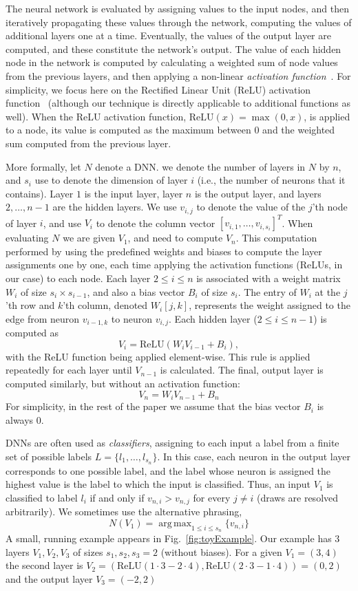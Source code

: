 \documentclass{easychair}
\DeclareMathOperator*{\argmax}{arg\,max}
\newcommand{\relu}{\text{ReLU}\xspace{}}
\begin{document}
The neural network is evaluated by assigning values to the input
nodes, and then iteratively propagating these values through the
network, computing the values of additional layers one at a
time. Eventually, the values of the output layer are computed, and
these constitute the network's output.  The value of each hidden node
in the network is computed by calculating a weighted sum of node
values from the previous layers, and then applying a non-linear
\emph{activation function}~\cite{FoBeCu16}.  For simplicity, we focus
here on the Rectified Linear Unit (ReLU) activation
function~\cite{NaHi10} (although our technique is directly applicable
to additional functions as well).  When the ReLU activation function,
$\relu{}(x) = \max{}(0, x)$, is applied to a node, its value is
computed as the maximum between $0$ and the weighted sum computed from
the previous layer.

More formally, let $N$ denote a DNN. we
denote the number of layers in $N$ by $n$, and $s_i$ use to denote the
dimension of layer $i$ (i.e., the number of neurons that it contains).
Layer $1$ is the input layer, layer $n$ is the output layer, and
layers $2,\ldots,n-1$ are the hidden layers.
We use $v_{i,j}$  to denote the value of the $j$'th node of layer $i$,
and use $V_i$ to denote the column vector $[v_{i,1},\ldots,v_{i,s_i}]^T$.
When evaluating $N$ we are given $V_1$, and need to compute $V_n$.
This computation 
performed by using the predefined weights and biases to compute the
layer assignments one by one, each time applying the activation
functions (ReLUs, in our case) to each node. Each layer $2\leq i\leq
n$
is associated
with a 
weight matrix $W_i$ of size $s_{i}\times s_{i-1}$, and also a bias vector $B_i$ of size
$s_i$. The entry of $W_i$ at the $j$'th row and $k$'th column, denoted
$W_i[j,k]$, represents the weight assigned to the edge from
neuron $v_{i-1,k}$ to neuron $v_{i,j}$.
Each hidden layer ($2\leq i \leq n-1$) 
is computed as
\[
V_i = \relu{}(W_i  V_{i-1} + B_i),
\]
with the ReLU
function being applied element-wise.
This rule is applied repeatedly for each layer until $V_{n-1}$ is
calculated.
The final, output layer is
computed similarly, but without an activation function:
\[
  V_n = W_i  V_{n-1} + B_n
\]
For simplicity, in the rest of the paper we assume that
the bias vector $B_i$ is always $0$.

DNNs are often used as \emph{classifiers}, assigning to each input a
label from a finite set of possible labels $L=\{l_1,\ldots,l_{s_n}\}$. In this case, each neuron
in the output layer corresponds to one possible label, and the label
whose neuron is assigned the highest value is the label to which the
input is classified. Thus, an input $V_1$ is classified to label $l_i$
if and only if $v_{n,i}>v_{n,j}$ for every $j\neq i$ (draws are
resolved arbitrarily). We sometimes use the alternative phrasing,
\[
  N(V_1) = \argmax_{1\leq i\leq s_n}\{v_{n,i}\}
\]
A small, running example appears in Fig.~\ref{fig:toyExample}. Our example has $3$ layers $V_1,V_2,V_3$ of sizes $s_1,s_2,s_3=2$ (without biases). For a given $V_1=(3,4)$ the second layer is $V_2=(\relu{}(1\cdot 3-2\cdot 4),\relu{}(2\cdot 3-1\cdot 4))=(0,2)$ and the output layer $V_3=(-2,2)$
\end{document}
